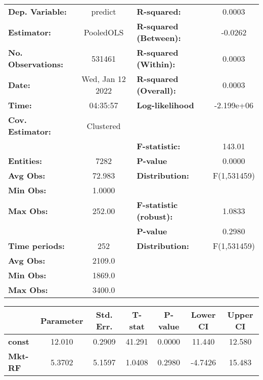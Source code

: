 \begin{center}
\begin{tabular}{lclc}
\toprule
\textbf{Dep. Variable:}    &      predict       & \textbf{  R-squared:         }   &      0.0003      \\
\textbf{Estimator:}        &     PooledOLS      & \textbf{  R-squared (Between):}  &     -0.0262      \\
\textbf{No. Observations:} &       531461       & \textbf{  R-squared (Within):}   &      0.0003      \\
\textbf{Date:}             &  Wed, Jan 12 2022  & \textbf{  R-squared (Overall):}  &      0.0003      \\
\textbf{Time:}             &      04:35:57      & \textbf{  Log-likelihood     }   &    -2.199e+06    \\
\textbf{Cov. Estimator:}   &     Clustered      & \textbf{                     }   &                  \\
\textbf{}                  &                    & \textbf{  F-statistic:       }   &      143.01      \\
\textbf{Entities:}         &        7282        & \textbf{  P-value            }   &      0.0000      \\
\textbf{Avg Obs:}          &       72.983       & \textbf{  Distribution:      }   &   F(1,531459)    \\
\textbf{Min Obs:}          &       1.0000       & \textbf{                     }   &                  \\
\textbf{Max Obs:}          &       252.00       & \textbf{  F-statistic (robust):} &      1.0833      \\
\textbf{}                  &                    & \textbf{  P-value            }   &      0.2980      \\
\textbf{Time periods:}     &        252         & \textbf{  Distribution:      }   &   F(1,531459)    \\
\textbf{Avg Obs:}          &       2109.0       & \textbf{                     }   &                  \\
\textbf{Min Obs:}          &       1869.0       & \textbf{                     }   &                  \\
\textbf{Max Obs:}          &       3400.0       & \textbf{                     }   &                  \\
\bottomrule
\end{tabular}
\begin{tabular}{lcccccc}
                & \textbf{Parameter} & \textbf{Std. Err.} & \textbf{T-stat} & \textbf{P-value} & \textbf{Lower CI} & \textbf{Upper CI}  \\
\midrule
\textbf{const}  &       12.010       &       0.2909       &      41.291     &      0.0000      &       11.440      &       12.580       \\
\textbf{Mkt-RF} &       5.3702       &       5.1597       &      1.0408     &      0.2980      &      -4.7426      &       15.483       \\
\bottomrule
\end{tabular}
\end{center}
